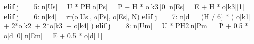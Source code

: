 \documentclass[
  a4paper,
]{article}
\newenvironment{Shaded}{}{}
\newcommand{\ControlFlowTok}[1]{\textcolor[rgb]{0.00,0.44,0.13}{\textbf{#1}}}
\newcommand{\DecValTok}[1]{\textcolor[rgb]{0.25,0.63,0.44}{#1}}
\newcommand{\FloatTok}[1]{\textcolor[rgb]{0.25,0.63,0.44}{#1}}
\newcommand{\NormalTok}[1]{#1}
\newcommand{\OperatorTok}[1]{\textcolor[rgb]{0.40,0.40,0.40}{#1}}
\newcommand{\StringTok}[1]{\textcolor[rgb]{0.25,0.44,0.63}{#1}}
\begin{document}
\begin{Shaded}
\begin{Highlighting}[]
    \ControlFlowTok{elif}\NormalTok{ j }\OperatorTok{==} \DecValTok{5}\NormalTok{:}
\NormalTok{        n[}\StringTok{\textquotesingle{}Us\textquotesingle{}}\NormalTok{] }\OperatorTok{=}\NormalTok{ U }\OperatorTok{*}\NormalTok{ PH}
\NormalTok{        n[}\StringTok{\textquotesingle{}Ps\textquotesingle{}}\NormalTok{] }\OperatorTok{=}\NormalTok{ P }\OperatorTok{+}\NormalTok{ H }\OperatorTok{*}\NormalTok{ o[}\StringTok{\textquotesingle{}k3\textquotesingle{}}\NormalTok{][}\DecValTok{0}\NormalTok{]}
\NormalTok{        n[}\StringTok{\textquotesingle{}Es\textquotesingle{}}\NormalTok{] }\OperatorTok{=}\NormalTok{ E }\OperatorTok{+}\NormalTok{ H }\OperatorTok{*}\NormalTok{ o[}\StringTok{\textquotesingle{}k3\textquotesingle{}}\NormalTok{][}\DecValTok{1}\NormalTok{]}
    \ControlFlowTok{elif}\NormalTok{ j }\OperatorTok{==} \DecValTok{6}\NormalTok{:}
\NormalTok{        n[}\StringTok{\textquotesingle{}k4\textquotesingle{}}\NormalTok{] }\OperatorTok{=}\NormalTok{ rr(o[}\StringTok{\textquotesingle{}Us\textquotesingle{}}\NormalTok{], o[}\StringTok{\textquotesingle{}Ps\textquotesingle{}}\NormalTok{], o[}\StringTok{\textquotesingle{}Es\textquotesingle{}}\NormalTok{], N)}
    \ControlFlowTok{elif}\NormalTok{ j }\OperatorTok{==} \DecValTok{7}\NormalTok{:}
\NormalTok{        n[}\StringTok{\textquotesingle{}d\textquotesingle{}}\NormalTok{] }\OperatorTok{=}\NormalTok{ (H }\OperatorTok{/} \DecValTok{6}\NormalTok{) }\OperatorTok{*}\NormalTok{ (}
\NormalTok{            o[}\StringTok{\textquotesingle{}k1\textquotesingle{}}\NormalTok{] }\OperatorTok{+} \DecValTok{2}\OperatorTok{*}\NormalTok{o[}\StringTok{\textquotesingle{}k2\textquotesingle{}}\NormalTok{] }\OperatorTok{+} \DecValTok{2}\OperatorTok{*}\NormalTok{o[}\StringTok{\textquotesingle{}k3\textquotesingle{}}\NormalTok{] }\OperatorTok{+}\NormalTok{ o[}\StringTok{\textquotesingle{}k4\textquotesingle{}}\NormalTok{]}
\NormalTok{        )}
    \ControlFlowTok{elif}\NormalTok{ j }\OperatorTok{==} \DecValTok{8}\NormalTok{:}
\NormalTok{        n[}\StringTok{\textquotesingle{}Um\textquotesingle{}}\NormalTok{] }\OperatorTok{=}\NormalTok{ U }\OperatorTok{*}\NormalTok{ PH2}
\NormalTok{        n[}\StringTok{\textquotesingle{}Pm\textquotesingle{}}\NormalTok{] }\OperatorTok{=}\NormalTok{ P }\OperatorTok{+} \FloatTok{0.5} \OperatorTok{*}\NormalTok{ o[}\StringTok{\textquotesingle{}d\textquotesingle{}}\NormalTok{][}\DecValTok{0}\NormalTok{]}
\NormalTok{        n[}\StringTok{\textquotesingle{}Em\textquotesingle{}}\NormalTok{] }\OperatorTok{=}\NormalTok{ E }\OperatorTok{+} \FloatTok{0.5} \OperatorTok{*}\NormalTok{ o[}\StringTok{\textquotesingle{}d\textquotesingle{}}\NormalTok{][}\DecValTok{1}\NormalTok{]}

\end{Highlighting}
\end{Shaded}
\end{document}
